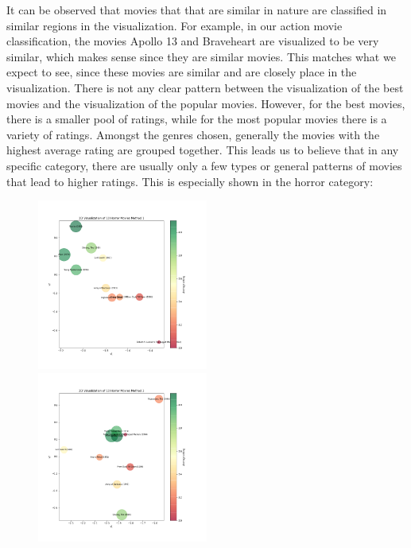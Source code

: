 \documentclass{article}
\begin{document}
\newpage

It can be observed that movies that that are similar in nature are classified in similar regions in the visualization. For example, in our action movie classification, the movies Apollo 13 and Braveheart are visualized to be very similar, which makes sense since they are similar movies. This matches what we expect to see, since these movies are similar and are closely place in the visualization. There is not any clear pattern between the visualization of the best movies and the visualization of the popular movies. However, for the best movies, there is a smaller pool of ratings, while for the most popular movies there is a variety of ratings. Amongst the genres chosen, generally the movies with the highest average rating are grouped together. This leads us to believe that in any specific category, there are usually only a few types or general patterns of movies that lead to higher ratings. This is especially shown in the horror category:
\begin{figure}[H]
\includegraphics[width=0.5\textwidth]{matrixfactorization/2D Visualization of 10 Horror Movies Method 1.png}
\includegraphics[width=0.5\textwidth]{matrixfactorization/2D Visualization of 10 Horror Movies Method 3.png}
\end{figure}
\end{document}
